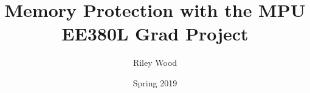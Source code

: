 \documentclass[]{report}
\begin{document}
\title{Memory Protection with the MPU \\
    \large EE380L Grad Project}
\author{Riley Wood}
\date{Spring 2019}
\maketitle













\end{document}

